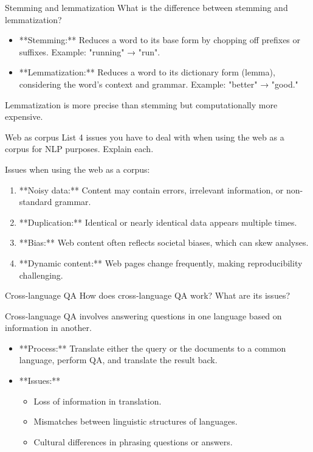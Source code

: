 \documentclass{article}
\begin{document}
\begin{exercise}{Stemming and lemmatization}
  What is the difference between stemming and lemmatization?

  \begin{solution}
    \begin{itemize}
        \item **Stemming:** Reduces a word to its base form by chopping off prefixes or suffixes. Example: "running" → "run".
        \item **Lemmatization:** Reduces a word to its dictionary form (lemma), considering the word's context and grammar. Example: "better" → "good."
    \end{itemize}
    Lemmatization is more precise than stemming but computationally more expensive.
  \end{solution}
\end{exercise}

\begin{exercise}{Web as corpus}
  List 4 issues you have to deal with when using the web as a corpus for NLP purposes. Explain each.

  \begin{solution}
    Issues when using the web as a corpus:
    \begin{enumerate}
        \item **Noisy data:** Content may contain errors, irrelevant information, or non-standard grammar.
        \item **Duplication:** Identical or nearly identical data appears multiple times.
        \item **Bias:** Web content often reflects societal biases, which can skew analyses.
        \item **Dynamic content:** Web pages change frequently, making reproducibility challenging.
    \end{enumerate}
  \end{solution}
\end{exercise}

\begin{exercise}{Cross-language QA}
  How does cross-language QA work? What are its issues?

  \begin{solution}
    Cross-language QA involves answering questions in one language based on information in another.
    \begin{itemize}
        \item **Process:** Translate either the query or the documents to a common language, perform QA, and translate the result back.
        \item **Issues:** 
        \begin{itemize}
            \item Loss of information in translation.
            \item Mismatches between linguistic structures of languages.
            \item Cultural differences in phrasing questions or answers.
        \end{itemize}
    \end{itemize}
  \end{solution}
\end{exercise}
\end{document}

